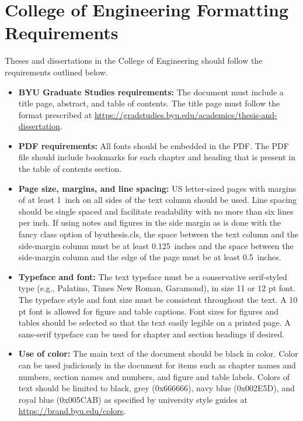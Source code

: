 \chapter{College of Engineering Formatting Requirements}
\label{ap:format}

Theses and dissertations in the College of Engineering should follow the requirements outlined below.

\begin{itemize}
\item {\bfseries BYU Graduate Studies requirements:}  The document must include a title page, abstract, and table of contents. The title page must follow the format prescribed at \url{https://gradstudies.byu.edu/academics/thesis-and-dissertation}.  

\item {\bfseries PDF requirements:} All fonts should be embedded in the PDF. The PDF file should include bookmarks for each chapter and heading that is present in the table of contents section.

\item {\bfseries Page size, margins, and line spacing:} US letter-sized pages with margins of at least 1~inch on all sides of the text column should be used. Line spacing should be single spaced and facilitate readability with no more than six lines per inch. If using notes and figures in the side margin as is done with the {\ttfamily fancy} class option of {\ttfamily byuthesis.cls}, the space between the text column and the side-margin column must be at least 0.125~inches and the space between the side-margin column and the edge of the page must be at least 0.5~inches. 

\item {\bfseries Typeface and font:} The text typeface must be a conservative serif-styled type (e.g., Palatino, Times New Roman, Garamond), in size 11 or 12 pt font. The typeface style and font size must be consistent throughout the text. A 10 pt font is allowed for figure and table captions. Font sizes for figures and tables should be selected so that the text easily legible on a printed page. A sans-serif typeface can be used for chapter and section headings if desired.

\item {\bfseries Use of color:} The main text of the document should be black in color. Color can be used judiciously in the document for items such as chapter names and numbers, section names and numbers, and figure and table labels. Colors of text should be limited to black, grey ({\ttfamily 0x666666}), navy blue ({\ttfamily 0x002E5D}), and royal blue ({\ttfamily 0x005CAB}) as specified by university style guides at \url{https://brand.byu.edu/colors}.


\end{itemize}

